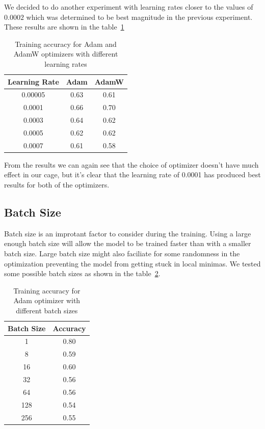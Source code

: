 \documentclass[12pt,a4paper,english
]{tunithesis}
\begin{document}
We decided to do another experiment with learning rates closer to the values of $0.0002$ which was determined to be best magnitude in the previous experiment. These results are shown in the table~\ref{tab:learningrates2}

\begin{table}[h!]
\centering
\begin{tabular}{|c|c|c|}
\hline
\textbf{Learning Rate} & \textbf{Adam} & \textbf{AdamW} \\ \hline
0.00005 & 0.63 & 0.61 \\ \hline
0.0001 & 0.66 & 0.70 \\ \hline
0.0003 & 0.64 & 0.62 \\ \hline
0.0005 & 0.62 & 0.62 \\ \hline
0.0007 & 0.61 & 0.58 \\ \hline
\end{tabular}
\caption{Training accuracy for Adam and AdamW optimizers with different learning rates}
\label{tab:learningrates2}
\end{table}

From the results we can again see that the choice of optimizer doesn't have much effect in our cage, but it's clear that the learning rate of 0.0001 has produced best results for both of the optimizers.

\subsection{Batch Size}
Batch size is an improtant factor to consider during the training. Using a large enough batch size will allow the model to be trained faster than with a smaller batch size. Large batch size might also faciliate for some randomness in the optimization preventing the model from getting stuck in local minimas. We tested some possible batch sizes as shown in the table~\ref{tab:batchsizes}.
\begin{table}[h!]
\centering
\begin{tabular}{|c|c|}
\hline
\textbf{Batch Size} & \textbf{Accuracy} \\ \hline
1 & 0.80 \\ \hline
8 & 0.59 \\ \hline
16 & 0.60 \\ \hline
32 & 0.56 \\ \hline
64 & 0.56 \\ \hline
128 & 0.54 \\ \hline
256 & 0.55 \\ \hline
\end{tabular}
\caption{Training accuracy for Adam optimizer with different batch sizes}
\label{tab:batchsizes}
\end{table}
\end{document}

